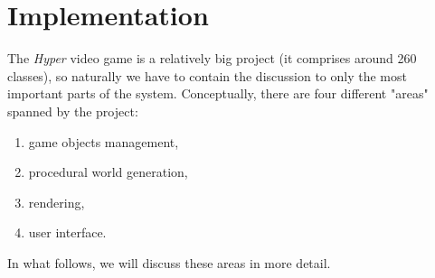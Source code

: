 \chapter{Implementation} \label{ch:implementation}
The \textit{Hyper} video game is a relatively big project (it comprises around 260 classes), so naturally we have to contain the discussion to only the most important parts of the system.
Conceptually, there are four different "areas" spanned by the project:
\begin{enumerate}
  \item game objects management,
  \item procedural world generation,
  \item rendering,
  \item user interface.
\end{enumerate}

In what follows, we will discuss these areas in more detail.





